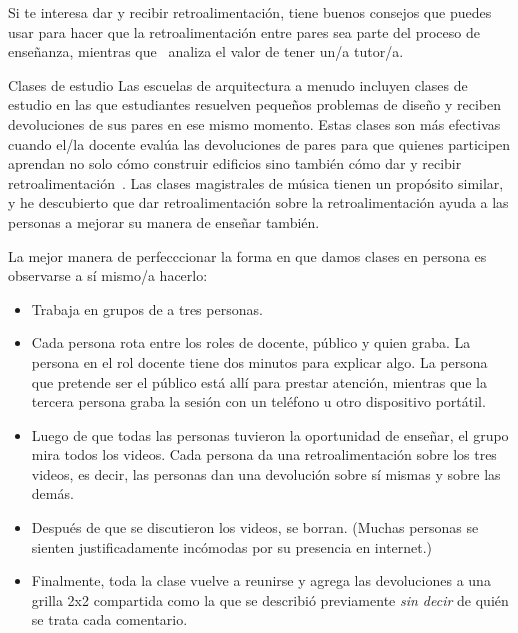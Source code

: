 Si te interesa dar y recibir retroalimentación,
\cite{Gorm2014} tiene buenos consejos
que puedes usar para hacer que la retroalimentación entre pares sea parte del proceso de enseñanza,
mientras que~\cite{Gawa2011} analiza el valor de tener un/a tutor/a.

\begin{aside}{Clases de estudio}
  Las escuelas de arquitectura a menudo incluyen clases de estudio
  en las que estudiantes resuelven pequeños problemas de diseño
  y reciben devoluciones de sus pares en ese mismo momento.
  Estas clases son más efectivas cuando el/la docente evalúa las devoluciones de pares
  para que quienes participen aprendan no solo cómo construir edificios
  sino también cómo dar y recibir retroalimentación~\cite{Scho1984}.
  Las clases magistrales de música tienen un propósito similar,
  y he descubierto que dar retroalimentación sobre la retroalimentación
  ayuda a las personas a mejorar su manera de enseñar también.
\end{aside}


La mejor manera de perfecccionar la forma en que damos clases en persona es observarse a sí mismo/a hacerlo:

\begin{itemize}

\item
  Trabaja en grupos de a tres personas.

\item
  Cada persona rota entre los roles de docente, público y quien graba.
  La persona en el rol docente tiene dos minutos para explicar algo.
  La persona que pretende ser el público está allí para prestar atención,
  mientras que la tercera persona graba la sesión con un teléfono u otro dispositivo portátil.

\item
  Luego de que todas las personas tuvieron la oportunidad de enseñar,
  el grupo mira todos los videos.
  Cada persona da una retroalimentación sobre los tres videos,
  es decir, las personas dan una devolución sobre sí mismas y sobre las demás.
 
\item
  Después de que se discutieron los videos,
  se borran.
  (Muchas personas se sienten justificadamente incómodas por su presencia en internet.)

\item
  Finalmente,
  toda la clase vuelve a reunirse
  y agrega las devoluciones a una grilla 2x2 compartida como la que se describió previamente
  \emph{sin decir} de quién se trata cada comentario.

\end{itemize}

